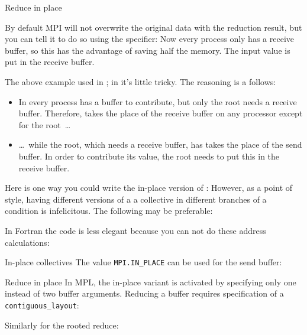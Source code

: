  {Reduce in place}
\label{sec:allreduce-inplace}

By default MPI will not overwrite the original data with the reduction
result, but you can tell it to do so
using the  specifier:
%
%
Now every process only has a receive buffer, so this
has the advantage of saving half the memory.
The input value is put in the receive buffer.

The above example used  in
;
in  it's little  tricky.
The reasoning is a follows:
\begin{itemize}
\item In  every process has a buffer to
  contribute, but only the root needs a receive buffer. Therefore,
   takes the place of the receive buffer
  on any processor except for the root~\ldots
\item \dots~while the root, which needs a receive buffer,
  has  takes the place of the send buffer.
  In order to contribute its value, the root needs to put this in the
  receive buffer.
\end{itemize}

Here is one way you could write the in-place version of :
%
%
However, as a point of style, having different versions of a a collective
in different branches of a condition is infelicitous. The following may be preferable:
%

In Fortran the code is less elegant because you can not do
these address calculations:
%

\begin{pythonnote}{In-place collectives}
  The value \lstinline+MPI.IN_PLACE+ can be used for the send buffer:
\end{pythonnote}

\begin{mplnote}{Reduce in place}
  In \ac{MPL}, the in-place variant is activated by
  specifying only one instead of two buffer arguments.
  Reducing a buffer requires specification of a \lstinline+contiguous_layout+:

  Similarly for the rooted reduce:
\end{mplnote}

